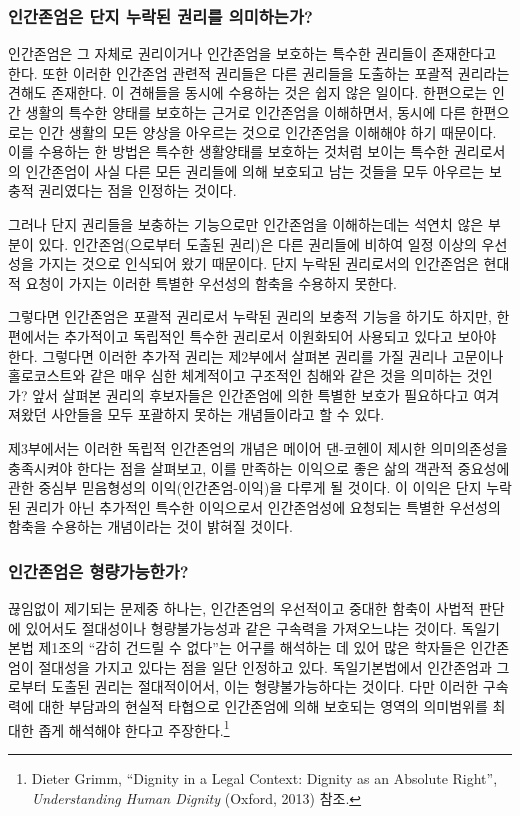 \subsubsection{인간존엄은 단지 누락된 권리를 의미하는가?}

인간존엄은 그 자체로 권리이거나 인간존엄을 보호하는 특수한 권리들이 존재한다고 한다. 또한 이러한 인간존엄 관련적 권리들은 다른 권리들을 도출하는 포괄적 권리라는 견해도 존재한다. 이 견해들을 동시에 수용하는 것은 쉽지 않은 일이다. 한편으로는 인간 생활의 특수한 양태를 보호하는 근거로 인간존엄을 이해하면서, 동시에 다른 한편으로는 인간 생활의 모든 양상을 아우르는 것으로 인간존엄을 이해해야 하기 때문이다. 이를 수용하는 한 방법은 특수한 생활양태를 보호하는 것처럼 보이는 특수한 권리로서의 인간존엄이 사실 다른 모든 권리들에 의해 보호되고 남는 것들을 모두 아우르는 보충적 권리였다는 점을 인정하는 것이다.

그러나 단지 권리들을 보충하는 기능으로만 인간존엄을 이해하는데는 석연치 않은 부분이 있다. 인간존엄(으로부터 도출된 권리)은 다른 권리들에 비하여 일정 이상의 우선성을 가지는 것으로 인식되어 왔기 때문이다. 단지 누락된 권리로서의 인간존엄은 현대적 요청이 가지는 이러한 특별한 우선성의 함축을 수용하지 못한다.

그렇다면 인간존엄은 포괄적 권리로서 누락된 권리의 보충적 기능을 하기도 하지만, 한편에서는 추가적이고 독립적인 특수한 권리로서 이원화되어 사용되고 있다고 보아야 한다. 그렇다면 이러한 추가적 권리는 제2부에서 살펴본 권리를 가질 권리나 고문이나 홀로코스트와 같은 매우 심한 체계적이고 구조적인 침해와 같은 것을 의미하는 것인가? 앞서 살펴본 권리의 후보자들은 인간존엄에 의한 특별한 보호가 필요하다고 여겨져왔던 사안들을 모두 포괄하지 못하는 개념들이라고 할 수 있다.

제3부에서는 이러한 독립적 인간존엄의 개념은 메이어 댄-코헨이 제시한 의미의존성을 충족시켜야 한다는 점을 살펴보고, 이를 만족하는 이익으로 좋은 삶의 객관적 중요성에 관한 중심부 믿음형성의 이익(인간존엄-이익)을 다루게 될 것이다. 이 이익은 단지 누락된 권리가 아닌 추가적인 특수한 이익으로서 인간존엄성에 요청되는 특별한 우선성의 함축을 수용하는 개념이라는 것이 밝혀질 것이다.

\subsubsection{인간존엄은 형량가능한가?}

끊임없이 제기되는 문제중 하나는, 인간존엄의 우선적이고 중대한 함축이 사법적 판단에 있어서도 절대성이나 형량불가능성과 같은 구속력을 가져오느냐는 것이다. 독일기본법 제1조의 ``감히 건드릴 수 없다''는 어구를 해석하는 데 있어 많은 학자들은 인간존엄이 절대성을 가지고 있다는 점을 일단 인정하고 있다. 독일기본법에서 인간존엄과 그로부터 도출된 권리는 절대적이어서, 이는 형량불가능하다는 것이다. 다만 이러한 구속력에 대한 부담과의 현실적 타협으로 인간존엄에 의해 보호되는 영역의 의미범위를 최대한 좁게 해석해야 한다고 주장한다.\footnote{Dieter Grimm, ``Dignity in a Legal Context: Dignity as an Absolute Right'', \emph{Understanding Human Dignity} (Oxford, 2013) 참조.}

